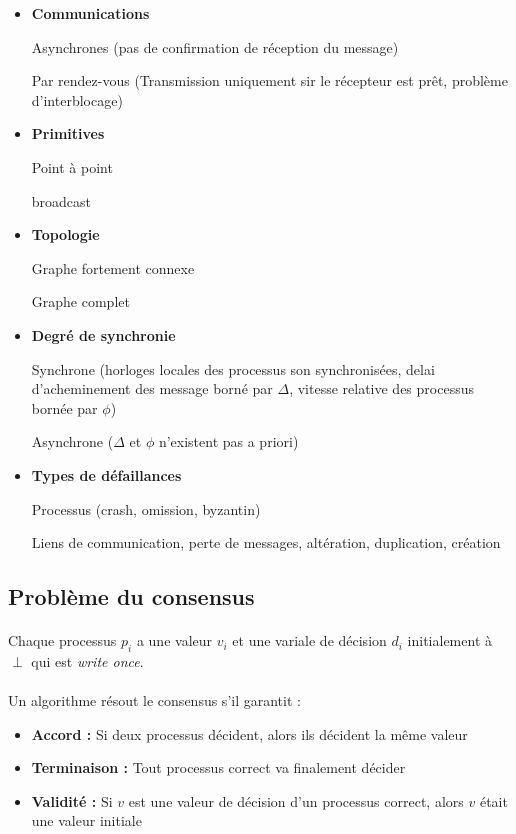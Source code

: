 \documentclass[french]{article}
\begin{document}
\begin{itemize}
	\item \textbf{Communications}
	
	Asynchrones (pas de confirmation de réception du message)
	
	Par rendez-vous (Transmission uniquement sir le récepteur est prêt, problème d'interblocage)
	
	\item \textbf{Primitives} 
	
	Point à point
	
	broadcast
	
	\item \textbf{Topologie}
	
	Graphe fortement connexe
	
	Graphe complet
	
	\item \textbf{Degré de synchronie}
	
	Synchrone (horloges locales des processus son synchronisées, delai d'acheminement des message borné par $\Delta$, vitesse relative des processus bornée par $\phi$)
	
	Asynchrone ($\Delta$ et $\phi$ n'existent pas a priori)
	
	\item \textbf{Types de défaillances}
	
	Processus (crash, omission, byzantin)
	
	Liens de communication, perte de messages, altération, duplication, création
\end{itemize}

\subsection{Problème du consensus}

\paragraph{}Chaque processus $p_i$ a une valeur $v_i$ et une variale de décision $d_i$ initialement à $\perp$ qui est \emph{write once}.

\paragraph{}Un algorithme résout le consensus s'il garantit :
\begin{itemize}
	\item \textbf{Accord :} Si deux processus décident, alors ils décident la même valeur
	\item \textbf{Terminaison :} Tout processus correct va finalement décider
	\item \textbf{Validité :} Si $v$ est une valeur de décision d'un processus correct, alors $v$ était une valeur initiale
\end{itemize}
\end{document}
